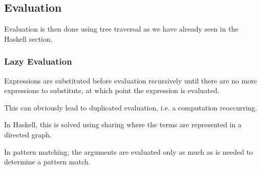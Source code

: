 \newpage
\subsection{Evaluation}
Evaluation is then done using tree traversal as we have already seen in the Haskell section.


\subsubsection{Lazy Evaluation}
Expressions are substituted before evaluation recursively until there are no more expressions to substitute, at which point the expression is evaluated.

This can obviously lead to duplicated evaluation, i.e. a computation reoccurring.

In Haskell, this is solved using sharing where the terms are represented in a directed graph.

In pattern matching, the arguments are evaluated only as much as is needed to determine a pattern match.
